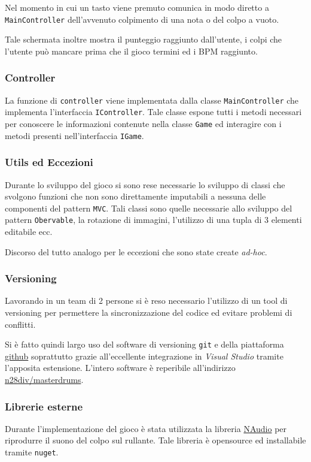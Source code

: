 Nel momento in cui un tasto viene premuto comunica in modo diretto a \texttt{MainController} dell'avvenuto colpimento di una nota o del colpo a vuoto.

Tale schermata inoltre mostra il punteggio raggiunto dall'utente, i colpi che l'utente può mancare prima che il gioco termini ed i BPM raggiunto.

\subsubsection{Controller}
La funzione di \texttt{controller} viene implementata dalla classe \texttt{MainController} che implementa l'interfaccia \texttt{IController}.
Tale classe espone tutti i metodi necessari per conoscere le informazioni contenute nella classe \texttt{Game} ed interagire con i metodi presenti nell'interfaccia \texttt{IGame}.

\newpage
\subsubsection{Utils ed Eccezioni}
Durante lo sviluppo del gioco si sono rese necessarie lo sviluppo di classi che svolgono funzioni che non sono direttamente imputabili a nessuna delle componenti del pattern \texttt{MVC}.
Tali classi sono quelle necessarie allo sviluppo del pattern \texttt{Obervable}, la rotazione di immagini, l'utilizzo di una tupla di 3 elementi editabile ecc.

Discorso del tutto analogo per le eccezioni che sono state create \emph{ad-hoc}.

\subsubsection{Versioning}
Lavorando in un team di 2 persone si è reso necessario l'utilizzo di un tool di versioning per permettere la sincronizzazione del codice ed evitare problemi di conflitti.

Si è fatto quindi largo uso del software di versioning \texttt{git} e della piattaforma \hyperlink{https://github.com}{github} soprattutto grazie all'eccellente integrazione in \emph{Visual Studio} tramite l'apposita estensione.
L'intero software è reperibile all'indirizzo \hyperlink{https://github.com/n28div/masterdrums}{n28div/masterdrums}.

\subsubsection{Librerie esterne}
Durante l'implementazione del gioco è stata utilizzata la libreria \hyperlink{https://github.com/naudio/NAudio}{NAudio} per riprodurre il suono del colpo sul rullante.
Tale libreria è opensource ed installabile tramite \texttt{nuget}.
\newpage
